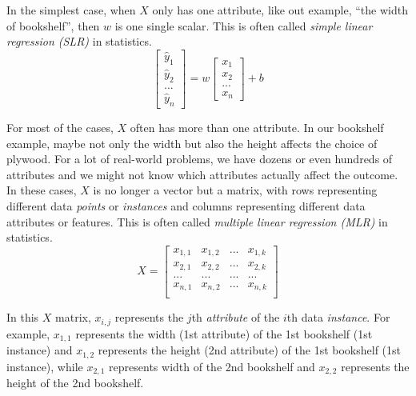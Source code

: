 \documentclass[
	letterpaper
]{article}
\begin{document}
In the simplest case, when $X$ only has one attribute, like out example, ``the width of bookshelf'', then $w$ is one single scalar.
This is often called \textit{simple linear regression (SLR)} in statistics.
\begin{equation}
\begin{bmatrix}\hat y_1 \\ \hat y_2 \\ ... \\ \hat y_n\end{bmatrix}
 = w\begin{bmatrix} x_1 \\  x_2 \\ ... \\ x_n\end{bmatrix}+b
\end{equation}

For most of the cases, $X$ often has more than one attribute. 
In our bookshelf example, maybe not only the width but also the height affects the choice of plywood.
For a lot of real-world problems, we have dozens or even hundreds of attributes and we might not know which attributes actually affect the outcome.
In these cases, $X$ is no longer a vector but a matrix, with rows representing different data \textit{points} or \textit{instances} and columns representing different data attributes or features.
This is often called \textit{multiple linear regression (MLR)} in statistics.
\begin{equation}
X =
\begin{bmatrix}
x_{1, 1} & x_{1, 2} & ... & x_{1, k} \\
x_{2, 1} & x_{2, 2} & ... & x_{2, k} \\
... & ... & ... & ... \\
x_{n, 1} & x_{n, 2} & ... & x_{n, k} \\
\end{bmatrix}
\end{equation}

In this $X$ matrix, $x_{i, j}$ represents the $j$th \textit{attribute} of the $i$th data \textit{instance}.
For example, $x_{1, 1}$ represents the width (1st attribute) of the 1st bookshelf (1st instance) and $x_{1, 2}$ represents the height (2nd attribute) of the 1st bookshelf (1st instance), while $x_{2, 1}$ represents width of the 2nd bookshelf and $x_{2, 2}$ represents the height of the 2nd bookshelf.
\end{document}
